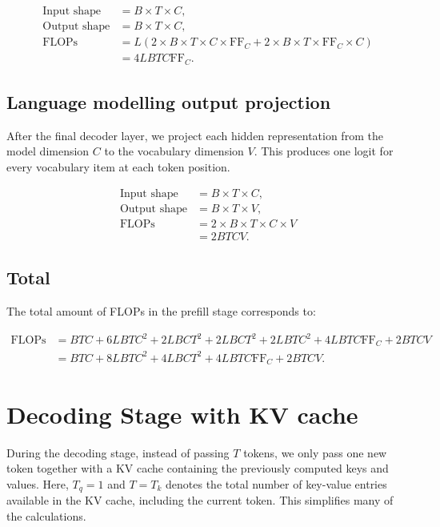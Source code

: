 \documentclass{article}
\begin{document}
\begin{align}
\text{Input shape}  &= \boxed{B \times T \times C}, \\
\text{Output shape} &= \boxed{B \times T \times C}, \\
\text{FLOPs}
   &= L \left(
       2 \times B \times T \times C \times \mathrm{FF}_C
       + 2 \times B \times T \times \mathrm{FF}_C \times C
   \right) \\
   &= \boxed{4LBTC\mathrm{FF}_C}.
\end{align}


\subsection{Language modelling output projection}

After the final decoder layer, we project each hidden representation from the model dimension $C$ to the vocabulary dimension $V$. This produces one logit for every vocabulary item at each token position.

\begin{align}
\text{Input shape}  &= \boxed{B \times T \times C}, \\
\text{Output shape} &= \boxed{B \times T \times V}, \\
\text{FLOPs}
   &= 2 \times B \times T \times C \times V \\
   &= \boxed{2BTCV}.
\end{align}


\subsection{Total}

The total amount of FLOPs in the prefill stage corresponds to:

\begin{align}
\text{FLOPs}
&= BTC
+ 6LBTC^2
+ 2LBCT^2
+ 2LBCT^2
+ 2LBTC^2
+ 4LBTC\mathrm{FF}_C
+ 2BTCV \\
&= \boxed{
   BTC
   + 8LBTC^2
   + 4LBCT^2
   + 4LBTC\mathrm{FF}_C
   + 2BTCV
 }.
\end{align}


\section{Decoding Stage with KV cache}

During the decoding stage, instead of passing $T$ tokens, we only pass one new token together with a KV cache containing the previously computed keys and values. Here, $T_q = 1$ and $T = T_k$ denotes the total number of key-value entries available in the KV cache, including the current token. This simplifies many of the calculations.
\end{document}
